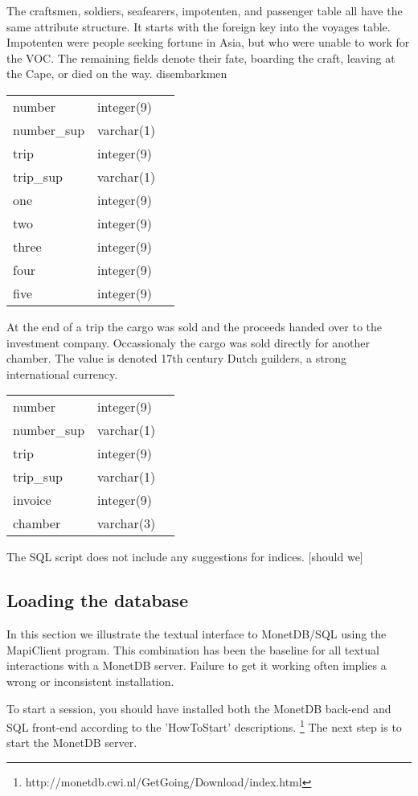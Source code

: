 \documentclass[10pt,twocolumn,fleqn]{article}
\begin{document}
The craftsmen, soldiers, seafearers, impotenten, and passenger table 
all have the same attribute structure. It starts with the foreign key
into the voyages table. 
Impotenten were people seeking fortune in Asia, but who were
unable to work for the VOC.
The remaining fields denote their fate, boarding the craft,
leaving at the Cape, or died on the way.
disembarkmen

{\footnotesize
\begin{tabular}{l l l}
number	& integer(9)	& \\
number\_sup	& varchar(1)	& \\
trip	& integer(9)	& \\
trip\_sup	& varchar(1)	& \\
one	& integer(9)	&  \\
two	& integer(9)	& \\
three	& integer(9)	& \\
four	& integer(9)	& \\
five	& integer(9)	& \\
\end{tabular}
}

At the end of a trip the cargo was sold and the proceeds handed over
to the investment company.  Occassionaly the cargo was sold
directly for another chamber. The value is denoted 17th century
Dutch guilders, a strong international currency.
{\footnotesize
\begin{tabular}{l l l}
number	& integer(9)	& \\
number\_sup	& varchar(1)	& \\
trip	& integer(9)	& \\
trip\_sup	& varchar(1)	& \\
invoice	& integer(9)	& \\
chamber	& varchar(3)
\end{tabular}
}

The SQL script does not include any suggestions for indices.
[should we]
\subsection{Loading the database}
\label{mapi}
In this section we illustrate the textual interface to MonetDB/SQL using the
MapiClient program. This combination has been the baseline for all textual
interactions with a MonetDB server.
Failure to get it working often implies a wrong or inconsistent installation.

To start a session, you should have installed both the
MonetDB back-end and SQL front-end according to the 'HowToStart' descriptions.
\footnote{http://monetdb.cwi.nl/GetGoing/Download/index.html}
The next step is to start the MonetDB server.
\end{document}
